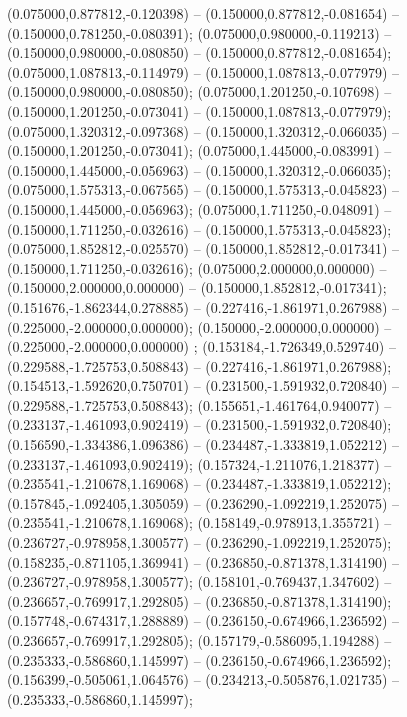  (0.075000,0.877812,-0.120398) -- (0.150000,0.877812,-0.081654) -- (0.150000,0.781250,-0.080391);
 (0.075000,0.980000,-0.119213) -- (0.150000,0.980000,-0.080850) -- (0.150000,0.877812,-0.081654);
 (0.075000,1.087813,-0.114979) -- (0.150000,1.087813,-0.077979) -- (0.150000,0.980000,-0.080850);
 (0.075000,1.201250,-0.107698) -- (0.150000,1.201250,-0.073041) -- (0.150000,1.087813,-0.077979);
 (0.075000,1.320312,-0.097368) -- (0.150000,1.320312,-0.066035) -- (0.150000,1.201250,-0.073041);
 (0.075000,1.445000,-0.083991) -- (0.150000,1.445000,-0.056963) -- (0.150000,1.320312,-0.066035);
 (0.075000,1.575313,-0.067565) -- (0.150000,1.575313,-0.045823) -- (0.150000,1.445000,-0.056963);
 (0.075000,1.711250,-0.048091) -- (0.150000,1.711250,-0.032616) -- (0.150000,1.575313,-0.045823);
 (0.075000,1.852812,-0.025570) -- (0.150000,1.852812,-0.017341) -- (0.150000,1.711250,-0.032616);
 (0.075000,2.000000,0.000000) -- (0.150000,2.000000,0.000000) -- (0.150000,1.852812,-0.017341);
 (0.151676,-1.862344,0.278885) -- (0.227416,-1.861971,0.267988) -- (0.225000,-2.000000,0.000000);
 (0.150000,-2.000000,0.000000) -- (0.225000,-2.000000,0.000000) ;
 (0.153184,-1.726349,0.529740) -- (0.229588,-1.725753,0.508843) -- (0.227416,-1.861971,0.267988);
 (0.154513,-1.592620,0.750701) -- (0.231500,-1.591932,0.720840) -- (0.229588,-1.725753,0.508843);
 (0.155651,-1.461764,0.940077) -- (0.233137,-1.461093,0.902419) -- (0.231500,-1.591932,0.720840);
 (0.156590,-1.334386,1.096386) -- (0.234487,-1.333819,1.052212) -- (0.233137,-1.461093,0.902419);
 (0.157324,-1.211076,1.218377) -- (0.235541,-1.210678,1.169068) -- (0.234487,-1.333819,1.052212);
 (0.157845,-1.092405,1.305059) -- (0.236290,-1.092219,1.252075) -- (0.235541,-1.210678,1.169068);
 (0.158149,-0.978913,1.355721) -- (0.236727,-0.978958,1.300577) -- (0.236290,-1.092219,1.252075);
 (0.158235,-0.871105,1.369941) -- (0.236850,-0.871378,1.314190) -- (0.236727,-0.978958,1.300577);
 (0.158101,-0.769437,1.347602) -- (0.236657,-0.769917,1.292805) -- (0.236850,-0.871378,1.314190);
 (0.157748,-0.674317,1.288889) -- (0.236150,-0.674966,1.236592) -- (0.236657,-0.769917,1.292805);
 (0.157179,-0.586095,1.194288) -- (0.235333,-0.586860,1.145997) -- (0.236150,-0.674966,1.236592);
 (0.156399,-0.505061,1.064576) -- (0.234213,-0.505876,1.021735) -- (0.235333,-0.586860,1.145997);

